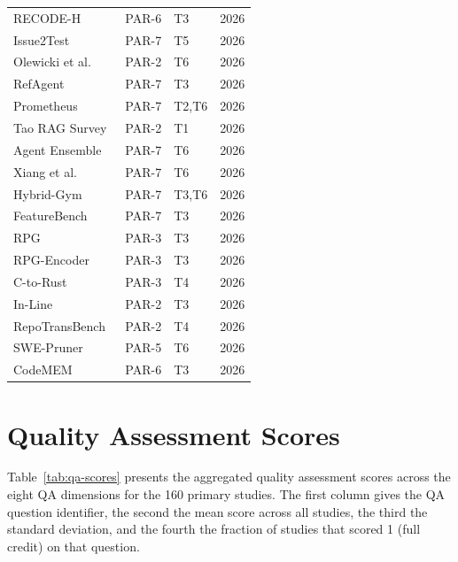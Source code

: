 \begin{longtable}{p{5cm}p{1.2cm}p{1.5cm}r}
RECODE-H~\cite{miao2026recodeh}                  & PAR-6 & T3       & 2026 \\
Issue2Test~\cite{nashid2026issue2test}            & PAR-7 & T5       & 2026 \\
Olewicki et al.~\cite{olewicki2026impact}         & PAR-2 & T6       & 2026 \\
RefAgent~\cite{oueslati2026refagent}             & PAR-7 & T3       & 2026 \\
Prometheus~\cite{pan2026prometheus}              & PAR-7 & T2,T6    & 2026 \\
Tao RAG Survey~\cite{tao2026ragsurvey}           & PAR-2 & T1       & 2026 \\
Agent Ensemble~\cite{tian2026agent}              & PAR-7 & T6       & 2026 \\
Xiang et al.~\cite{xiang2026evaluating}          & PAR-7 & T6       & 2026 \\
Hybrid-Gym~\cite{xie2026hybridgym}               & PAR-7 & T3,T6    & 2026 \\
FeatureBench~\cite{zhou2026featurebench}          & PAR-7 & T3       & 2026 \\
RPG~\cite{luo2026rpg}                            & PAR-3 & T3       & 2026 \\
RPG-Encoder~\cite{luo2026closing}               & PAR-3 & T3       & 2026 \\
C-to-Rust~\cite{feng2026dependency}              & PAR-3 & T4       & 2026 \\
In-Line~\cite{hu2026inline}                      & PAR-2 & T3       & 2026 \\
RepoTransBench~\cite{wang2026repotransbench}      & PAR-2 & T4       & 2026 \\
SWE-Pruner~\cite{wang2026swepruner}              & PAR-5 & T6       & 2026 \\
CodeMEM~\cite{wang2026codemem}                   & PAR-6 & T3       & 2026 \\
\end{longtable}

\section{Quality Assessment Scores}
\label{appendix:qa}

Table~\ref{tab:qa-scores} presents the aggregated quality assessment scores across the eight
QA dimensions for the 160 primary studies. The first column gives the QA question identifier,
the second the mean score across all studies, the third the standard deviation, and the fourth
the fraction of studies that scored 1 (full credit) on that question.

